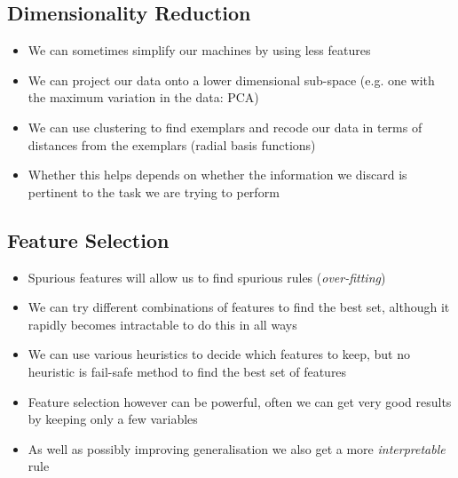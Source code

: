 \begin{slide}
\section{Dimensionality Reduction}

\begin{PauseHighLight}
  \begin{itemize}
  \item We can sometimes simplify our machines by using less features\pause
  \item We can project our data onto a lower dimensional sub-space
    (e.g. one with the maximum variation in the data: PCA)\pause
  \item We can use clustering to find exemplars and recode our data in
    terms of distances from the exemplars (radial basis
    functions)\pause
  \item Whether this helps depends on whether the information we discard
    is pertinent to the task we are trying to perform\pause
  \end{itemize}
\end{PauseHighLight}

\end{slide}




\begin{slide}
\section[-1]{Feature Selection}

\begin{PauseHighLight}
  \begin{itemize}
  \item Spurious features will allow us to find spurious rules
    (\emph{over-fitting})\pause
  \item We can try different combinations of features to find the best
    set, although it rapidly becomes intractable to do this in all
    ways\pause
  \item We can use various heuristics to decide which features to keep,
    but no heuristic is fail-safe method to find the best set of features\pause
  \item Feature selection however can be powerful, often we can get very
    good results by keeping only a few variables\pause
  \item As well as possibly improving generalisation we also get a more
    \emph{interpretable} rule\pause
  \end{itemize}
\end{PauseHighLight}

\end{slide}

